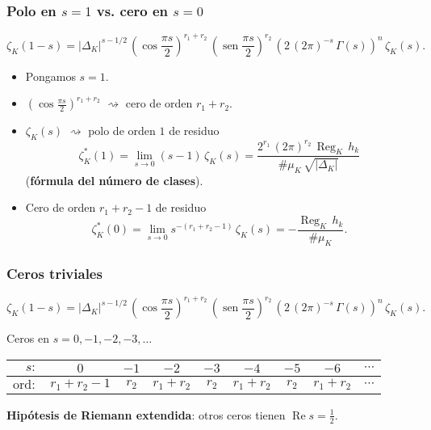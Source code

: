 \documentclass[handout]{beamer}
\DeclareMathOperator{\Reg}{Reg}
\renewcommand{\Re}{\operatorname{Re}}
\renewcommand{\sin}{\operatorname{sen}}
\begin{document}
\begin{frame}
  \frametitle{Polo en $s = 1$ vs. cero en $s = 0$}

  \[ \zeta_K (1-s) = |\Delta_K|^{s - 1/2}\,\left(\cos\frac{\pi s}{2}\right)^{r_1+r_2}\,\left(\sin\frac{\pi s}{2}\right)^{r_2}\,\left(2\,(2\pi)^{-s}\,\Gamma (s)\right)^n\,\zeta_K (s). \]

  \begin{itemize}
  \item<1-> Pongamos $s = 1$.

  \item<2-> $\left(\cos\frac{\pi s}{2}\right)^{r_1+r_2}$ $\rightsquigarrow$ cero de orden $r_1 + r_2$.

  \item<3-> $\zeta_K (s)$ $\rightsquigarrow$ polo de orden $1$ de residuo
    $$\zeta_K^* (1) = \lim_{s \to 0} (s-1)\,\zeta_K (s) = \frac{2^{r_1}\,(2\pi)^{r_2}\,\Reg_K\,h_k}{\#\mu_K\,\sqrt{|\Delta_K|}}$$
    (\textbf{fórmula del número de clases}).

  \item<4-> Cero de orden $r_1 + r_2 - 1$ de residuo
    $$\zeta_K^* (0) = \lim_{s \to 0} s^{-(r_1 + r_2 - 1)}\,\zeta_K (s) = -\frac{\Reg_K\,h_k}{\# \mu_K}.$$
  \end{itemize}
\end{frame}


\begin{frame}
  \frametitle{Ceros triviales}

  \[ \zeta_K (1-s) = |\Delta_K|^{s - 1/2}\,\left(\cos\frac{\pi s}{2}\right)^{r_1+r_2}\,\left(\sin\frac{\pi s}{2}\right)^{r_2}\,\left(2\,(2\pi)^{-s}\,\Gamma (s)\right)^n\,\zeta_K (s). \]

  Ceros en $s = 0,-1,-2,-3,\ldots$
  \begin{center}\small
    \renewcommand{\arraystretch}{1.5}
    \begin{tabular}{rcccccccc}
      \hline
      $s\colon$ & $0$ & $-1$ & $-2$ & $-3$ & $-4$ & $-5$ & $-6$ & $\cdots$ \\
      \hline
      $\text{ord}\colon$ & $r_1 + r_2 - 1$ & $r_2$ & $r_1 + r_2$ & $r_2$ & $r_1 + r_2$ & $r_2$ & $r_1 + r_2$ & $\cdots$ \\
      \hline
    \end{tabular}
  \end{center}

  \textbf{Hipótesis de Riemann extendida}: otros ceros tienen
  $\Re s = \frac{1}{2}$.
\end{frame}
\end{document}
